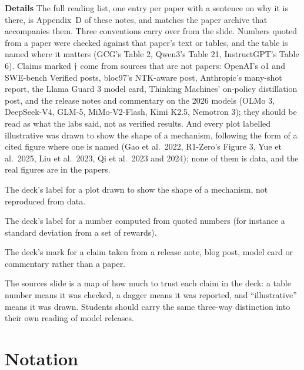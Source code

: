 \documentclass[11pt,letterpaper]{article}
\newcommand{\setstage}[1]{\colorlet{stagec}{#1}}
\newcommand{\para}[1]{\medskip\noindent\textbf{#1}\quad}
\newenvironment{terms}{\begin{tcolorbox}[termsbox]\begin{description}[leftmargin=1.1em,itemsep=3pt,topsep=2pt,font=\normalfont]}{\end{description}\end{tcolorbox}}
\newcommand{\term}[2]{\item[\textbf{#1}]\index{#1} #2}
\newenvironment{intuition}{\begin{tcolorbox}[intuitionbox]}{\end{tcolorbox}}
\begin{document}
\para{Details} The full reading list, one entry per paper with a sentence on why it is there, is Appendix~D of these notes, and matches the paper archive that accompanies them. Three conventions carry over from the slide. Numbers quoted from a paper were checked against that paper's text or tables, and the table is named where it matters (GCG's Table 2, Qwen3's Table 21, InstructGPT's Table 6). Claims marked $\dagger$ come from sources that are not papers: OpenAI's o1 and SWE-bench Verified posts, bloc97's NTK-aware post, Anthropic's many-shot report, the Llama Guard 3 model card, Thinking Machines' on-policy distillation post, and the release notes and commentary on the 2026 models (OLMo 3, DeepSeek-V4, GLM-5, MiMo-V2-Flash, Kimi K2.5, Nemotron 3); they should be read as what the labs said, not as verified results. And every plot labelled illustrative was drawn to show the shape of a mechanism, following the form of a cited figure where one is named (Gao et al.\ 2022, R1-Zero's Figure 3, Yue et al.\ 2025, Liu et al.\ 2023, Qi et al.\ 2023 and 2024); none of them is data, and the real figures are in the papers.

\begin{terms}
\term{illustrative}{The deck's label for a plot drawn to show the shape of a mechanism, not reproduced from data.}
\term{derived}{The deck's label for a number computed from quoted numbers (for instance a standard deviation from a set of rewards).}
\term{$\dagger$}{The deck's mark for a claim taken from a release note, blog post, model card or commentary rather than a paper.}
\end{terms}

\begin{intuition}
The sources slide is a map of how much to trust each claim in the deck: a table number means it was checked, a dagger means it was reported, and ``illustrative'' means it was drawn. Students should carry the same three-way distinction into their own reading of model releases.
\end{intuition}
\clearpage
\appendix
\setstage{ink}
\section{Notation}
\end{document}
